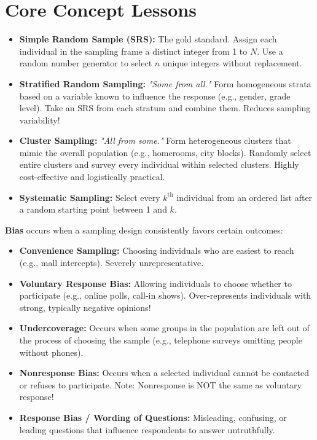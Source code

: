 \section{Core Concept Lessons}

\begin{lessonbox}
\begin{itemize}[leftmargin=1.2em]
  \item \textbf{Simple Random Sample (SRS):} The gold standard. Assign each individual in the sampling frame a distinct integer from 1 to $N$. Use a random number generator to select $n$ unique integers without replacement.
  \item \textbf{Stratified Random Sampling:} \textit{"Some from all."} Form homogeneous strata based on a variable known to influence the response (e.g., gender, grade level). Take an SRS from each stratum and combine them. Reduces sampling variability!
  \item \textbf{Cluster Sampling:} \textit{"All from some."} Form heterogeneous clusters that mimic the overall population (e.g., homerooms, city blocks). Randomly select entire clusters and survey every individual within selected clusters. Highly cost-effective and logistically practical.
  \item \textbf{Systematic Sampling:} Select every $k^{\text{th}}$ individual from an ordered list after a random starting point between 1 and $k$.
\end{itemize}
\end{lessonbox}

\begin{lessonbox}
\textbf{Bias} occurs when a sampling design consistently favors certain outcomes:
\begin{itemize}[leftmargin=1.2em]
  \item \textbf{Convenience Sampling:} Choosing individuals who are easiest to reach (e.g., mall intercepts). Severely unrepresentative.
  \item \textbf{Voluntary Response Bias:} Allowing individuals to choose whether to participate (e.g., online polls, call-in shows). Over-represents individuals with strong, typically negative opinions!
  \item \textbf{Undercoverage:} Occurs when some groups in the population are left out of the process of choosing the sample (e.g., telephone surveys omitting people without phones).
  \item \textbf{Nonresponse Bias:} Occurs when a selected individual cannot be contacted or refuses to participate. Note: Nonresponse is NOT the same as voluntary response!
  \item \textbf{Response Bias / Wording of Questions:} Misleading, confusing, or leading questions that influence respondents to answer untruthfully.
\end{itemize}
\end{lessonbox}

